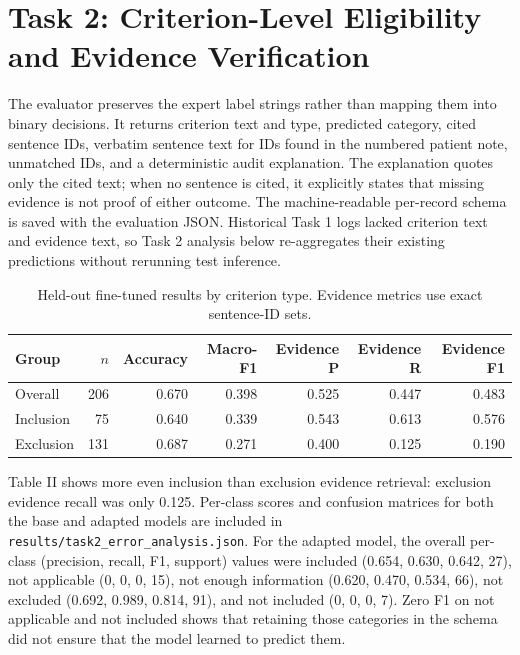 \documentclass[conference]{IEEEtran}
\begin{document}
\section{Task 2: Criterion-Level Eligibility and Evidence Verification}
The evaluator preserves the expert label strings rather than mapping them into binary decisions. It returns criterion text and type, predicted category, cited sentence IDs, verbatim sentence text for IDs found in the numbered patient note, unmatched IDs, and a deterministic audit explanation. The explanation quotes only the cited text; when no sentence is cited, it explicitly states that missing evidence is not proof of either outcome. The machine-readable per-record schema is saved with the evaluation JSON. Historical Task 1 logs lacked criterion text and evidence text, so Task 2 analysis below re-aggregates their existing predictions without rerunning test inference.

\begin{table}[t]\centering\caption{Held-out fine-tuned results by criterion type. Evidence metrics use exact sentence-ID sets.}\begin{tabular}{lrrrrrr}\toprule Group & $n$ & Accuracy & Macro-F1 & Evidence P & Evidence R & Evidence F1 \\\midrule Overall & 206 & 0.670 & 0.398 & 0.525 & 0.447 & 0.483 \\
Inclusion & 75 & 0.640 & 0.339 & 0.543 & 0.613 & 0.576 \\
Exclusion & 131 & 0.687 & 0.271 & 0.400 & 0.125 & 0.190 \\\bottomrule\end{tabular}\end{table}
Table II shows more even inclusion than exclusion evidence retrieval: exclusion evidence recall was only 0.125. Per-class scores and confusion matrices for both the base and adapted models are included in \texttt{results/task2\_error\_analysis.json}. For the adapted model, the overall per-class (precision, recall, F1, support) values were included (0.654, 0.630, 0.642, 27), not applicable (0, 0, 0, 15), not enough information (0.620, 0.470, 0.534, 66), not excluded (0.692, 0.989, 0.814, 91), and not included (0, 0, 0, 7). Zero F1 on not applicable and not included shows that retaining those categories in the schema did not ensure that the model learned to predict them.
\end{document}
